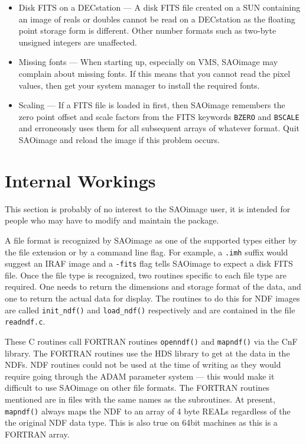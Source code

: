 \begin{itemize}
\item{Disk FITS on a DECstation --- A disk FITS file created on a SUN
containing an image of reals or doubles cannot be read on a DECstation
as the floating point storage form is different. Other number formats
such as two-byte unsigned integers are unaffected.}

\item{Missing fonts --- When starting up, especially on VMS, SAOimage may
complain about missing fonts. If this means that you cannot read the
pixel values, then get your system manager to install the required
fonts.}

\item{Scaling --- If a FITS file is loaded in first, then SAOimage
remembers the zero point offset and scale factors from the FITS
keywords {\tt BZERO} and {\tt BSCALE} and erroneously uses them
for all subsequent arrays of whatever format. Quit SAOimage and reload
the image if this problem occurs.}

\end{itemize} 

\section{Internal Workings}

This section is probably of no interest to the SAOimage user, it is intended
for people who may have to modify and maintain the package.

A file format is recognized by SAOimage as one of the supported types
either by the file extension or by a command line flag. For example, a
{\tt .imh} suffix would suggest an IRAF image and a {\tt -fits} flag
tells SAOimage to expect a disk FITS file. Once the file type is
recognized, two routines specific to each file type are required. One
needs to return the dimensions and storage format of the data, and one
to return the actual data for display. The routines to do this for NDF
images are called {\tt init\_ndf()} and {\tt load\_ndf()} respectively
and are contained in the file {\tt readndf.c}.

These C routines call FORTRAN routines {\tt openndf()} and {\tt mapndf()} 
via the CnF
library. The FORTRAN routines use the HDS library to get at the data in the
NDFs.  NDF routines could not be used at the time of writing as they would
require going through the ADAM parameter system --- this would make it
difficult to use SAOimage on other file formats. The FORTRAN routines
mentioned are in files with the same names as the subroutines. At present,
{\tt mapndf()} always maps the NDF to an array of 4 byte REALs regardless 
of the
the original NDF data type.  This is also true on 64bit machines as this is
a FORTRAN array.


